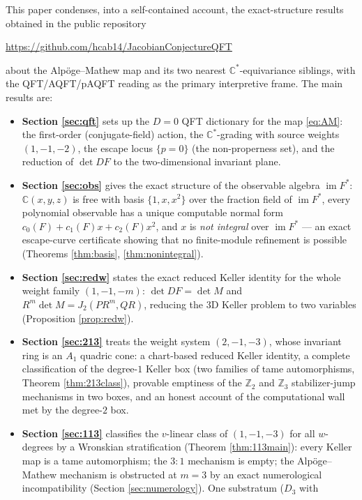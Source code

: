 \documentclass[11pt]{article}
\theoremstyle{definition}
\theoremstyle{remark}
\newcommand{\C}{\mathbb{C}}
\newcommand{\Z}{\mathbb{Z}}
\newcommand{\im}{\operatorname{im}}
\begin{document}
This paper condenses, into a self-contained account, the exact-structure
results obtained in the public repository
\begin{center}
\url{https://github.com/hcab14/JacobianConjectureQFT}
\end{center}
about the Alp\"oge--Mathew map and its two nearest
$\C^*$-equivariance siblings, with the QFT/AQFT/pAQFT reading as the
primary interpretive frame. The main results are:

\begin{itemize}
\item \textbf{Section \ref{sec:qft}} sets up the $D=0$ QFT dictionary
 for the map \eqref{eq:AM}: the first-order (conjugate-field) action,
 the $\C^*$-grading with source weights $(1,-1,-2)$, the escape locus
 $\{p=0\}$ (the non-properness set), and the reduction of $\det DF$ to
 the two-dimensional invariant plane.
\item \textbf{Section \ref{sec:obs}} gives the exact structure of the
 observable algebra $\im F^*$: $\C(x,y,z)$ is free with basis
 $\{1,x,x^2\}$ over the fraction field of $\im F^*$, every polynomial
 observable has a unique computable normal form
 $c_0(F)+c_1(F)x+c_2(F)x^2$, and $x$ is \emph{not integral} over
 $\im F^*$ --- an exact escape-curve certificate showing that no
 finite-module refinement is possible (Theorems \ref{thm:basis},
 \ref{thm:nonintegral}).
\item \textbf{Section \ref{sec:redw}} states the exact reduced Keller
 identity for the whole weight family $(1,-1,-m)$:
 $\det DF = \det M$ and $R^m \det M = J_2(PR^m, QR)$, reducing the 3D
 Keller problem to two variables (Proposition \ref{prop:redw}).
\item \textbf{Section \ref{sec:213}} treats the weight system
 $(2,-1,-3)$, whose invariant ring is an $A_1$ quadric cone: a
 chart-based reduced Keller identity, a complete classification of the
 degree-$1$ Keller box (two families of tame automorphisms, Theorem
 \ref{thm:213class}), provable emptiness of the $\Z_2$ and $\Z_3$
 stabilizer-jump mechanisms in two boxes, and an honest account of the
 computational wall met by the degree-$2$ box.
\item \textbf{Section \ref{sec:113}} classifies the $v$-linear class of
 $(1,-1,-3)$ for all $w$-degrees by a Wronskian stratification
 (Theorem \ref{thm:113main}): every Keller map is a tame automorphism;
 the $3{:}1$ mechanism is empty; the Alp\"oge--Mathew mechanism is
 obstructed at $m=3$ by an exact numerological incompatibility
 (Section \ref{sec:numerology}). One substratum ($D_3$ with

\end{itemize}
\end{document}
